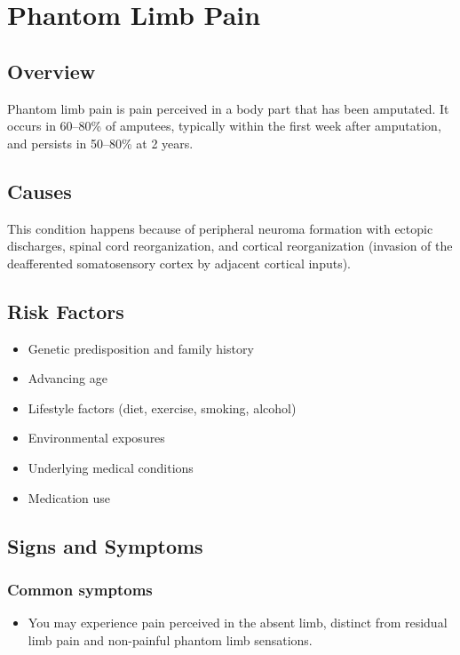 \chapter{Phantom Limb Pain}
\label{sec:Phantom Limb Pain}

\section{Overview}
Phantom limb pain is pain perceived in a body part that has been amputated. It occurs in 60--80\% of amputees, typically within the first week after amputation, and persists in 50--80\% at 2 years.
\section{Causes}
This condition happens because of peripheral neuroma formation with ectopic discharges, spinal cord reorganization, and cortical reorganization (invasion of the deafferented somatosensory cortex by adjacent cortical inputs).     
\section{Risk Factors}

\begin{itemize}[noitemsep]
  \item Genetic predisposition and family history
  \item Advancing age
  \item Lifestyle factors (diet, exercise, smoking, alcohol)
  \item Environmental exposures
  \item Underlying medical conditions
  \item Medication use
\end{itemize}
\section{Signs and Symptoms}

\subsection{Common symptoms}
\begin{itemize}[noitemsep]
  \item You may experience pain perceived in the absent limb, distinct from residual limb pain and non-painful phantom limb sensations. 
  \end{itemize}

